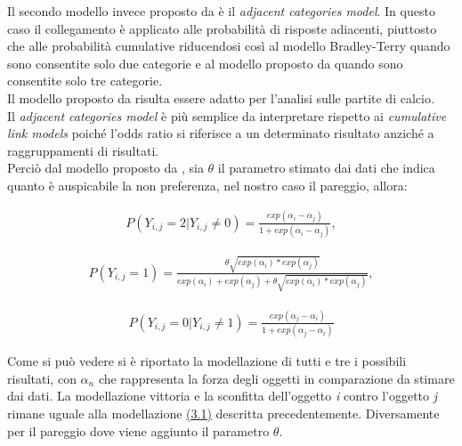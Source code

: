 Il secondo modello invece proposto da \autocite{agresti1992analysis} è il \emph{adjacent categories model}. In questo caso il collegamento è applicato alle probabilità di risposte adiacenti, piuttosto che alle probabilità cumulative riducendosi così al modello Bradley-Terry quando sono consentite solo due categorie e al modello proposto da \autocite{davidson1970extending} quando sono consentite solo tre categorie.\\
Il modello proposto da \autocite{davidson1970extending} risulta essere adatto per l'analisi sulle partite di calcio.\\
Il \emph{adjacent categories model} è più semplice da interpretare rispetto ai \emph{cumulative link models} poiché l'odds ratio si riferisce a un determinato risultato anziché a raggruppamenti di risultati. \\
Perciò dal modello proposto da \autocite{davidson1970extending}, sia $\theta$ il parametro stimato dai dati che indica quanto è auspicabile la non preferenza, nel nostro caso il pareggio, allora:

\begin{align}
	P(Y_{i,j} = 2 | Y_{i,j} \not = 0) =  \frac{exp(\alpha_{i} - \alpha_{j})}{1 + exp(\alpha_{i} - \alpha_{j})}, 
\end{align}
	
\begin{align}
	P(Y_{i,j} = 1) =  \frac{\theta \sqrt{exp(\alpha_{i}) * exp(\alpha_{j})}}{exp(\alpha_{i}) + exp(\alpha_{j}) + \theta\sqrt{exp(\alpha_{i}) * exp(\alpha_{j})}}, 
\end{align}

\begin{align}	
	P(Y_{i,j} = 0 | Y_{i,j} \not = 1) =  \frac{exp(\alpha_{j} - \alpha_{i})}{1 + exp(\alpha_{j} - \alpha_{i})}
\end{align}

Come si può vedere si è riportato la modellazione di tutti e tre i possibili risultati, con $\alpha_{n}$ che rappresenta la forza degli oggetti in comparazione da stimare dai dati. La modellazione vittoria e la sconfitta dell'oggetto \textit{i} contro l'oggetto \textit{j} rimane uguale alla modellazione \hyperref[for:3.1]{(3.1)} descritta precedentemente. Diversamente per il pareggio dove viene aggiunto il parametro $\theta$. \\

